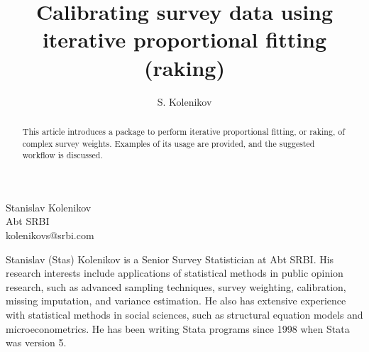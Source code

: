 \author{S. Kolenikov}{%
  Stanislav Kolenikov\\Abt SRBI\\kolenikovs@srbi.com
}
\title[Raking survey data]{Calibrating survey data using iterative proportional fitting (raking)}
\maketitle

\begin{abstract}
This article introduces a package to perform iterative proportional fitting,
or raking, of complex survey weights. Examples of its usage are provided,
and the suggested workflow is discussed.

\end{abstract}







\begin{aboutauthor}
  Stanislav (Stas) Kolenikov is a Senior Survey Statistician at Abt SRBI. 
  His research interests include
  applications of statistical methods in public opinion research,
  such as advanced sampling techniques, survey weighting,
  calibration, missing imputation, and variance estimation.
  He also has extensive experience with
  statistical methods in social sciences, such as structural equation
  models and microeconometrics. He has been writing Stata programs since
  1998 when Stata was version 5.
\end{aboutauthor}
